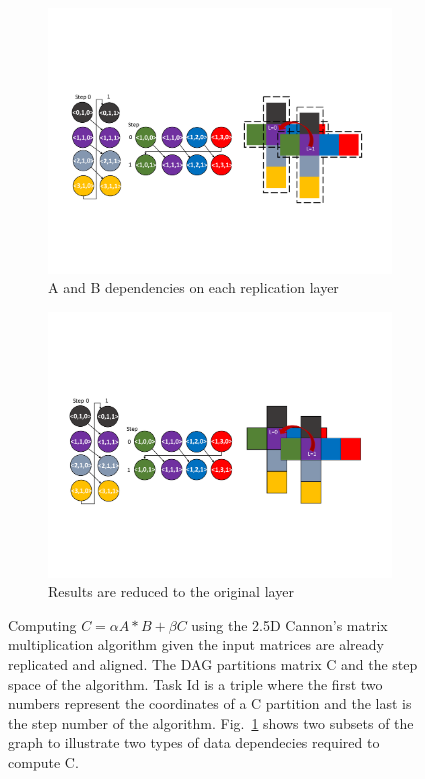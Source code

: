 \begin{figure}[htb]
\centering
\begin{subfigure}[b]{0.45\textwidth}
\includegraphics[width=\textwidth]{figures/cannon0.pdf}
\caption{A and B dependencies on each replication layer}
\label{deps}
\end{subfigure}
\begin{subfigure}[b]{0.37\textwidth}
\includegraphics[width=\textwidth]{figures/cannon1.pdf}
\caption{Results are reduced to the original layer}
\label{dataspace}
\end{subfigure}
\caption{Computing $C= \alpha A * B + \beta C$ using the 2.5D Cannon's matrix multiplication algorithm given the input matrices are already replicated and aligned. 
The DAG partitions matrix C and the step space of the algorithm.
Task Id is a triple where the first two numbers represent the coordinates of a C partition and the last is the step number of the algorithm. 
Fig.~\ref{deps} shows two subsets of the graph to illustrate two types of data dependecies required to compute C.}
\label{fig:25DCannon}
\end{figure}


